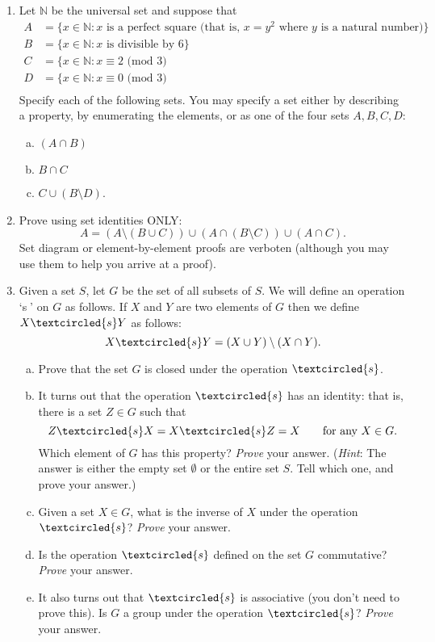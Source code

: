 \begin{enumerate}

\item
Let ${\mathbb N}$ be the universal set and suppose that
\begin{align*}
A &= \{ x \in {\mathbb N} : x \text{ is a perfect square (that is, } x=y^2 \text{ where } y \text{ is a natural number)}\} \\ 
B &= \{ x \in {\mathbb N} : x \text{ is divisible by 6}\} \\ 
C &= \{ x \in {\mathbb N} : x  \equiv 2 \text{ (mod 3)} \\
D &= \{ x \in {\mathbb N} : x  \equiv 0 \text{ (mod 3)} \\
\end{align*} 
Specify each of the following sets. You may specify a set either by describing a property, by enumerating the elements, or as one of the four sets $A, B, C, D$:
\begin{enumerate}[(a)]
\item
$(A \cap B)$
\item
$B \cap C$
\item
$C \cup (B \setminus D)$.
\end{enumerate}



\item
Prove using set identities ONLY:  
\[A = (A\setminus (B\cup C)) \cup (A\cap (B\setminus C)) \cup  (A \cap C).\]    
Set diagram or element-by-element proofs are verboten (although you may use them to help you arrive at a proof).

\item
Given a set $S$, let $G$ be the set of all subsets of $S$. We will define an operation `\textcircled{s}' on $G$ as follows.  If $X$ and $Y$ are two elements of $G$  then we define $X \textcircled{s} Y$ as follows:
\[ X \textcircled{s} Y = (X \cup Y) \setminus (X \cap Y) .\]
\begin{enumerate}[(a)]
\item
Prove that the set $G$ is closed under the operation $\textcircled{s}$.
\item
It turns out that the operation $\textcircled{s}$ has an identity: that is, there is a set $Z \in G$ such that
\[  Z \textcircled{s} X = X \textcircled{s} Z = X  \qquad \text{for any $X \in G$.} \]
Which element of $G$ has this property?  \emph{Prove} your answer.  (\emph{Hint}:  The answer is either the empty set $\emptyset$ or the entire set $S$. Tell which one, and prove your answer.)  
\item
Given a set $X \in G$, what is the inverse of $X$ under the operation $\textcircled{s}$?  \emph{Prove} your answer. 
\item
Is the operation $\textcircled{s}$ defined on the set $G$ commutative? \emph{Prove} your answer. 
\item
It also turns out that $\textcircled{s}$ is associative (you don't need to prove this).  Is $G$ a group under the operation $\textcircled{s}$?  \emph{Prove} your answer.
\end{enumerate}


\end{enumerate}

